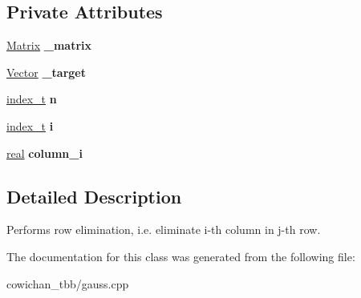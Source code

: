 \subsection*{Private Attributes}
\begin{CompactItemize}
\item 
\hypertarget{class_row_elimination_49344262a09cdf006d4b249e8fddf3d4}{
\hyperlink{cowichan_8hpp_3fb46f939e55c239fbc95656fc0f3399}{Matrix} \textbf{\_\-matrix}}
\label{class_row_elimination_49344262a09cdf006d4b249e8fddf3d4}

\item 
\hypertarget{class_row_elimination_1f473bc02c05aa508b467e6097e13ddf}{
\hyperlink{cowichan_8hpp_02bc1553e241b9b33408482658b3c355}{Vector} \textbf{\_\-target}}
\label{class_row_elimination_1f473bc02c05aa508b467e6097e13ddf}

\item 
\hypertarget{class_row_elimination_593558f30cdc67d74b41e11197a56095}{
\hyperlink{cowichan_8hpp_5b04577d5d21124855deaad298595371}{index\_\-t} \textbf{n}}
\label{class_row_elimination_593558f30cdc67d74b41e11197a56095}

\item 
\hypertarget{class_row_elimination_4ef655247f5284b1694b57f5687d2d40}{
\hyperlink{cowichan_8hpp_5b04577d5d21124855deaad298595371}{index\_\-t} \textbf{i}}
\label{class_row_elimination_4ef655247f5284b1694b57f5687d2d40}

\item 
\hypertarget{class_row_elimination_5a96a12ab6503193733e9e4c2e545f07}{
\hyperlink{cowichan_8hpp_4d521b2c54a1f6312cc8fa04827eaf98}{real} \textbf{column\_\-i}}
\label{class_row_elimination_5a96a12ab6503193733e9e4c2e545f07}

\end{CompactItemize}


\subsection{Detailed Description}
Performs row elimination, i.e. eliminate i-th column in j-th row. 

The documentation for this class was generated from the following file:\begin{CompactItemize}
\item 
cowichan\_\-tbb/gauss.cpp\end{CompactItemize}
